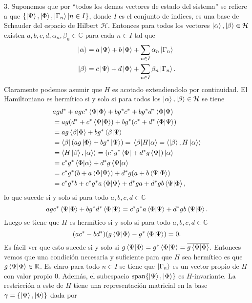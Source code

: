 \documentclass{article}
\DeclareMathOperator{\Span}{span}
\begin{document}
3. Suponemos que por ``todos los demas vectores de estado del sistema'' se refiere a que $\{\ket{\Psi},\ket{\Phi},\ket{\Gamma_n}|n\in I\}$, donde $I$ es el conjunto de indices, es una base de Schauder del espacio de Hilbert $\mathcal{H}$. Entonces para todos los vectores $\ket{\alpha},\ket{\beta}\in\mathcal{H}$ existen $a,b,c,d,\alpha_n,\beta_n\in\mathbb{C}$ para cada $n\in I$ tal que \begin{align}
\begin{split}
\ket{\alpha}&=a\ket{\Psi}+b\ket{\Phi}+\sum_{n\in I} \alpha_n\ket{\Gamma_n}\\ 
\ket{\beta}&=c\ket{\Psi}+d\ket{\Phi}+\sum_{n\in I}\beta_n\ket{\Gamma_n}.
\end{split}
\end{align}
Claramente podemos asumir que $H$ es acotado extendiendolo por continuidad. El Hamiltoniano es hermítico si y solo si para todos los $\ket{\alpha},\ket{\beta}\in\mathcal{H}$ se tiene
\begin{align}
\begin{split}
&agd^*+agc^*\ip{\Psi}{\Phi}+bg^*c^*+bg^*d^*\ip{\Phi}{\Psi}\\
&=ag(d^*+c^*\ip{\Psi}{\Phi})+bg^*(c^*+d^*\ip{\Phi}{\Psi})\\
&=ag\ip{\beta}{\Phi}+bg^*\ip{\beta}{\Psi}\\
&=\bra{\beta}(ag\ket{\Phi}+bg^*\ket{\Psi})=\mel{\beta}{H}{\alpha}=\langle \ket{\beta},H\ket{\alpha}\rangle\\
&=\langle H\ket{\beta},\ket{\alpha}\rangle=(c^*g^*\bra{\Phi}+d^*g\bra{\Psi})\ket{\alpha}\\
&=c^*g^*\ip{\Phi}{\alpha}+d^*g\ip{\Psi}{\alpha}\\
&=c^*g^*(b+a\ip{\Phi}{\Psi})+d^*g(a+b\ip{\Psi}{\Phi})\\
&=c^*g^*b+c^*g^*a\ip{\Phi}{\Psi}+d^*ga+d^*gb\ip{\Psi}{\Phi},
\end{split}
\end{align}
lo que sucede si y solo si para todo $a,b,c,d\in\mathbb{C}$
\begin{equation}
agc^*\ip{\Psi}{\Phi}+bg^*d^*\ip{\Phi}{\Psi}=c^*g^*a\ip{\Phi}{\Psi}+d^*gb\ip{\Psi}{\Phi}.
\end{equation}
Luego se tiene que $H$ es hermítico si y solo si para todo $a,b,c,d\in\mathbb{C}$
\begin{equation}
(ac^*-bd^*)(g\ip{\Psi}{\Phi}-g^*\ip{\Phi}{\Psi})=0.
\end{equation}
Es fácil ver que esto sucede si y solo si $g\ip{\Psi}{\Phi}=g^*\ip{\Phi}{\Psi}=\overline{g\ip{\Psi}{\Phi}}$. Entonces vemos que una condición necesaria y suficiente para que $H$ sea hermítico es que $g\ip{\Psi}{\Phi}\in\mathbb{R}$. Es claro para todo $n\in I$ se tiene que $\ket{\Gamma_n}$ es un vector propio de $H$ con valor propio $0$. Además, el subespacio $\Span\{\ket{\Psi},\ket{\Phi}\}$ es $H$-invariante. La restricción a este de $H$ tiene una representación matricial en la base $\gamma=\{\ket{\Psi},\ket{\Phi}\}$ dada por
\end{document}
